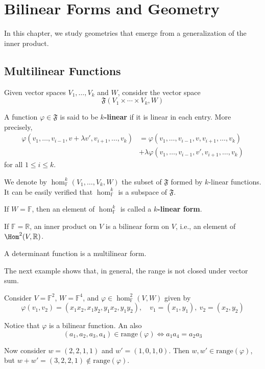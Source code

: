 \chapter{Bilinear Forms and Geometry}

In this chapter, we study geometries that emerge from a generalization of the inner product. 

\section{Multilinear Functions}

\begin{definition}
Given vector spaces $V_1, \ldots, V_k$ and $W$, consider the vector space 
\[
  \mathfrak{F}(V_1 \times \cdots \times V_k, W)
\]

A function $\varphi \in \mathfrak{F}$ is said to be \textbf{$k$-linear} if it is linear in each entry. More precisely,
\begin{equation*}
  \begin{aligned}
    \varphi(v_1, \ldots, v_{i-1}, v + \lambda v', v_{i+1}, \ldots, v_k) &= \varphi(v_1, \ldots, v_{i-1}, v, v_{i+1}, \ldots, v_k) \\
    &+ \lambda \varphi(v_1, \ldots, v_{i-1}, v', v_{i+1}, \ldots, v_k)
  \end{aligned}
\end{equation*}
for all $1 \leq i \leq k$.

We denote by $\hom_{\mathbb{F}}^k (V_1, \ldots, V_k, W)$ the subset of $\mathfrak{F}$ formed by $k$-linear functions. It can be easily verified that $\hom_{\mathbb{F}}^k$ is a subspace of $\mathfrak{F}$.

If $W = \mathbb{F}$, then an element of $\hom_{\mathbb{F}}^k$ is called a \textbf{$k$-linear form}. 
\end{definition}

\begin{example}
If $\mathbb{F} = \mathbb{R}$, an inner product on $V$ is a bilinear form on $V$, i.e., an element of $\Hom^2(V, \mathbb{R})$. 
\end{example}

\begin{example}[Determinant]
  A determinant function is a multilinear form.
\end{example}

The next example shows that, in general, the range is not closed under vector sum. 

\begin{example}
  Consider $V = \mathbb{F}^2$, $W = \mathbb{F}^4$, and $\varphi \in \hom_{\mathbb{F}}^2(V,W)$ given by
  \[
    \varphi(v_1, v_2) = (x_1 x_2, x_1 y_2, y_1 x_2, y_1 y_2), \quad v_1 = (x_1, y_1), ~v_2 = (x_2, y_2)
  \]

  Notice that $\varphi$ is a bilinear function. An also
  \[
    (a_1, a_2, a_3, a_4) \in \text{range}(\varphi) \iff a_1 a_4 = a_2 a_3
  \]

  Now consider $w = (2,2,1,1)$ and $w' = (1,0,1,0)$. Then $w, w' \in \text{range}(\varphi)$, but $w + w' = (3,2,2,1) \notin \text{range}(\varphi)$.
\end{example}


